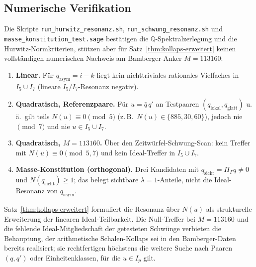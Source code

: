 \subsection{Numerische Verifikation}
\label{subsec:numerische-verifikation-schalen}

\begin{proposition}
\label{prop:numverifikation-schalen}
Die Skripte \texttt{run\_hurwitz\_resonanz.sh}, \texttt{run\_schwung\_resonanz.sh} und \texttt{masse\_konstitution\_test.sage} bestätigen die $\mathbb{Q}$-Spektralzerlegung und die Hurwitz-Normkriterien, stützen aber für Satz~\ref{thm:kollaps-erweitert} keinen vollständigen numerischen Nachweis am Bamberger-Anker $M=113160$:
\begin{enumerate}
    \item \textbf{Linear.} Für $q_{\mathrm{asym}}=i-k$ liegt kein nichttriviales rationales Vielfaches in $I_5 \cup I_7$ (lineare $I_5/I_7$-Resonanz negativ).
    \item \textbf{Quadratisch, Referenzpaare.} Für $u=\bar{q}\,q'$ an Testpaaren $(q_{\mathrm{lokal}}, q_{\mathrm{glatt}})$ u.\,ä.\ gilt teils $N(u)\equiv 0 \pmod{5}$ (z.\,B.\ $N(u)\in\{885,30,60\}$), jedoch nie $\pmod{7}$ und nie $u\in I_5 \cup I_7$.
    \item \textbf{Quadratisch, $M=113160$.} Über den Zeitwürfel-Schwung-Scan: kein Treffer mit $N(u)\equiv 0 \pmod{5,7}$ und kein Ideal-Treffer in $I_5 \cup I_7$.
    \item \textbf{Masse-Konstitution (orthogonal).} Drei Kandidaten mit $q_{\mathrm{sicht}}=\Pi_\Gamma q\neq 0$ und $N(q_{\mathrm{sicht}})\ge 1$; das belegt sichtbare $\lambda=1$-Anteile, nicht die Ideal-Resonanz von $q_{\mathrm{asym}}$.
\end{enumerate}
\end{proposition}

\begin{remark}
Satz~\ref{thm:kollaps-erweitert} formuliert die Resonanz über $N(u)$ als strukturelle Erweiterung der linearen Ideal-Teilbarkeit. Die Null-Treffer bei $M=113160$ und die fehlende Ideal-Mitgliedschaft der getesteten Schwünge verbieten die Behauptung, der arithmetische Schalen-Kollaps sei in den Bamberger-Daten bereits realisiert; sie rechtfertigen höchstens die weitere Suche nach Paaren $(q,q')$ oder Einheitenklassen, für die $u\in I_p$ gilt.
\end{remark}
